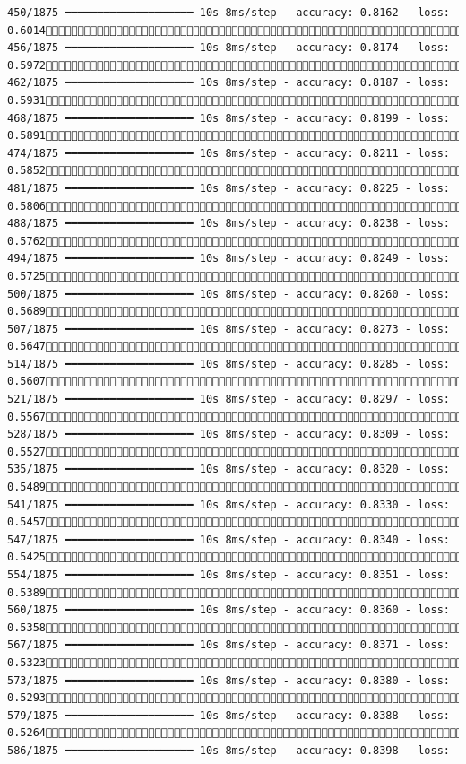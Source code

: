 \documentclass[
  letterpaper,
  DIV=11,
  numbers=noendperiod]{scrreprt}
\begin{document}
\begin{verbatim}
450/1875 ━━━━━━━━━━━━━━━━━━━━ 10s 8ms/step - accuracy: 0.8162 - loss: 0.6014 456/1875 ━━━━━━━━━━━━━━━━━━━━ 10s 8ms/step - accuracy: 0.8174 - loss: 0.5972 462/1875 ━━━━━━━━━━━━━━━━━━━━ 10s 8ms/step - accuracy: 0.8187 - loss: 0.5931 468/1875 ━━━━━━━━━━━━━━━━━━━━ 10s 8ms/step - accuracy: 0.8199 - loss: 0.5891 474/1875 ━━━━━━━━━━━━━━━━━━━━ 10s 8ms/step - accuracy: 0.8211 - loss: 0.5852 481/1875 ━━━━━━━━━━━━━━━━━━━━ 10s 8ms/step - accuracy: 0.8225 - loss: 0.5806 488/1875 ━━━━━━━━━━━━━━━━━━━━ 10s 8ms/step - accuracy: 0.8238 - loss: 0.5762 494/1875 ━━━━━━━━━━━━━━━━━━━━ 10s 8ms/step - accuracy: 0.8249 - loss: 0.5725 500/1875 ━━━━━━━━━━━━━━━━━━━━ 10s 8ms/step - accuracy: 0.8260 - loss: 0.5689 507/1875 ━━━━━━━━━━━━━━━━━━━━ 10s 8ms/step - accuracy: 0.8273 - loss: 0.5647 514/1875 ━━━━━━━━━━━━━━━━━━━━ 10s 8ms/step - accuracy: 0.8285 - loss: 0.5607 521/1875 ━━━━━━━━━━━━━━━━━━━━ 10s 8ms/step - accuracy: 0.8297 - loss: 0.5567 528/1875 ━━━━━━━━━━━━━━━━━━━━ 10s 8ms/step - accuracy: 0.8309 - loss: 0.5527 535/1875 ━━━━━━━━━━━━━━━━━━━━ 10s 8ms/step - accuracy: 0.8320 - loss: 0.5489 541/1875 ━━━━━━━━━━━━━━━━━━━━ 10s 8ms/step - accuracy: 0.8330 - loss: 0.5457 547/1875 ━━━━━━━━━━━━━━━━━━━━ 10s 8ms/step - accuracy: 0.8340 - loss: 0.5425 554/1875 ━━━━━━━━━━━━━━━━━━━━ 10s 8ms/step - accuracy: 0.8351 - loss: 0.5389 560/1875 ━━━━━━━━━━━━━━━━━━━━ 10s 8ms/step - accuracy: 0.8360 - loss: 0.5358 567/1875 ━━━━━━━━━━━━━━━━━━━━ 10s 8ms/step - accuracy: 0.8371 - loss: 0.5323 573/1875 ━━━━━━━━━━━━━━━━━━━━ 10s 8ms/step - accuracy: 0.8380 - loss: 0.5293 579/1875 ━━━━━━━━━━━━━━━━━━━━ 10s 8ms/step - accuracy: 0.8388 - loss: 0.5264 586/1875 ━━━━━━━━━━━━━━━━━━━━ 10s 8ms/step - accuracy: 0.8398 - loss: 
\end{verbatim}
\end{document}
